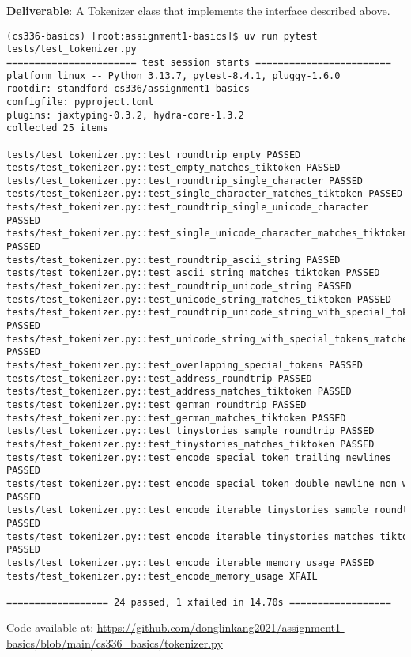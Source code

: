 \documentclass{article}
\begin{document}
\textbf{Deliverable}: A Tokenizer class that implements the interface described above.

\begin{lstlisting}
(cs336-basics) [root:assignment1-basics]$ uv run pytest tests/test_tokenizer.py
======================= test session starts ========================
platform linux -- Python 3.13.7, pytest-8.4.1, pluggy-1.6.0
rootdir: standford-cs336/assignment1-basics
configfile: pyproject.toml
plugins: jaxtyping-0.3.2, hydra-core-1.3.2
collected 25 items                                                 

tests/test_tokenizer.py::test_roundtrip_empty PASSED
tests/test_tokenizer.py::test_empty_matches_tiktoken PASSED
tests/test_tokenizer.py::test_roundtrip_single_character PASSED
tests/test_tokenizer.py::test_single_character_matches_tiktoken PASSED
tests/test_tokenizer.py::test_roundtrip_single_unicode_character PASSED
tests/test_tokenizer.py::test_single_unicode_character_matches_tiktoken PASSED
tests/test_tokenizer.py::test_roundtrip_ascii_string PASSED
tests/test_tokenizer.py::test_ascii_string_matches_tiktoken PASSED
tests/test_tokenizer.py::test_roundtrip_unicode_string PASSED
tests/test_tokenizer.py::test_unicode_string_matches_tiktoken PASSED
tests/test_tokenizer.py::test_roundtrip_unicode_string_with_special_tokens PASSED
tests/test_tokenizer.py::test_unicode_string_with_special_tokens_matches_tiktoken PASSED
tests/test_tokenizer.py::test_overlapping_special_tokens PASSED
tests/test_tokenizer.py::test_address_roundtrip PASSED
tests/test_tokenizer.py::test_address_matches_tiktoken PASSED
tests/test_tokenizer.py::test_german_roundtrip PASSED
tests/test_tokenizer.py::test_german_matches_tiktoken PASSED
tests/test_tokenizer.py::test_tinystories_sample_roundtrip PASSED
tests/test_tokenizer.py::test_tinystories_matches_tiktoken PASSED
tests/test_tokenizer.py::test_encode_special_token_trailing_newlines PASSED
tests/test_tokenizer.py::test_encode_special_token_double_newline_non_whitespace PASSED
tests/test_tokenizer.py::test_encode_iterable_tinystories_sample_roundtrip PASSED
tests/test_tokenizer.py::test_encode_iterable_tinystories_matches_tiktoken PASSED
tests/test_tokenizer.py::test_encode_iterable_memory_usage PASSED
tests/test_tokenizer.py::test_encode_memory_usage XFAIL

================== 24 passed, 1 xfailed in 14.70s ==================
\end{lstlisting}

\begin{answer}
Code available at: \url{https://github.com/donglinkang2021/assignment1-basics/blob/main/cs336_basics/tokenizer.py}
\end{answer}
\end{document}
